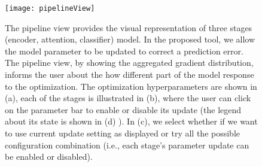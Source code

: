 \begin{figure}[htbp]
\centering
\vspace{-2mm}
 \texttt{[image: pipelineView]}
 \caption{
 The pipeline view provides the visual representation of three stages (encoder, attention, classifier) model. In the proposed tool, we allow the model parameter to be updated to correct a prediction error. The pipeline view, by showing the aggregated gradient distribution, informs the user about the how different part of the model response to the optimization.
 The optimization hyperparameters are shown in (a), each of the stages is illustrated in (b), where the user can click on the parameter bar to enable or disable its update (the legend about its state is shown in (d) ). In (c), we select whether if we want to use current update setting as displayed or try all the possible configuration combination (i.e., each stage's parameter update can be enabled or disabled).
 }
\label{fig:pipelineView}
\end{figure}

